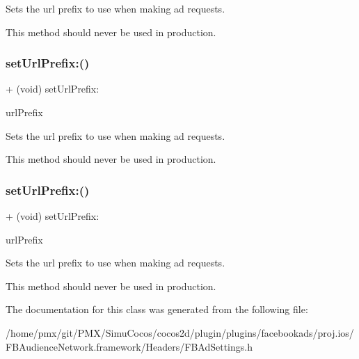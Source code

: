 Sets the url prefix to use when making ad requests.

This method should never be used in production. \mbox{\label{interfaceFBAdSettings_aab1304a0308648520b5dc1fda60a944c}} 
\subsubsection{\texorpdfstring{set\+Url\+Prefix\+:()}{setUrlPrefix:()}\hspace{0.1cm}{\footnotesize\ttfamily [4/5]}}
{\footnotesize\ttfamily + (void) set\+Url\+Prefix\+: \begin{DoxyParamCaption}\item[{(N\+S\+String $\ast$)}]{url\+Prefix }\end{DoxyParamCaption}}

Sets the url prefix to use when making ad requests.

This method should never be used in production. \mbox{\label{interfaceFBAdSettings_aab1304a0308648520b5dc1fda60a944c}} 
\subsubsection{\texorpdfstring{set\+Url\+Prefix\+:()}{setUrlPrefix:()}\hspace{0.1cm}{\footnotesize\ttfamily [5/5]}}
{\footnotesize\ttfamily + (void) set\+Url\+Prefix\+: \begin{DoxyParamCaption}\item[{(N\+S\+String $\ast$)}]{url\+Prefix }\end{DoxyParamCaption}}

Sets the url prefix to use when making ad requests.

This method should never be used in production. 

The documentation for this class was generated from the following file\+:\begin{DoxyCompactItemize}
\item 
/home/pmx/git/\+P\+M\+X/\+Simu\+Cocos/cocos2d/plugin/plugins/facebookads/proj.\+ios/\+F\+B\+Audience\+Network.\+framework/\+Headers/F\+B\+Ad\+Settings.\+h\end{DoxyCompactItemize}
